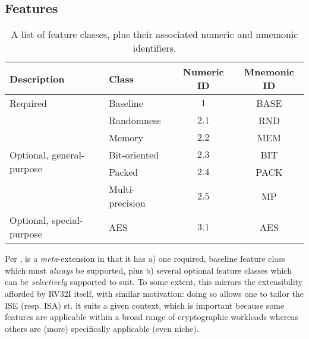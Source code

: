 
\subsection{Features}
\label{sec:bg:feature}

\begin{table}[t]
\begin{center}
\begin{tabular}{|l|l|cc|}
\hline
Description                                & Class           & Numeric ID & Mnemonic ID \\
\hline\hline
\multirow{1}{*}{Required                 } & Baseline        & $1$        & BASE        \\
\hline
\multirow{5}{*}{Optional, general-purpose} & Randomness      & $2.1$      & RND         \\
                                           & Memory          & $2.2$      & MEM         \\
                                           & Bit-oriented    & $2.3$      & BIT         \\
                                           & Packed          & $2.4$      & PACK        \\
                                           & Multi-precision & $2.5$      & MP          \\
\hline
\multirow{1}{*}{Optional, special-purpose} & AES             & $3.1$      & AES         \\
\hline
\end{tabular}
\end{center}
\caption{A list of feature classes, plus their associated numeric and mnemonic identifiers.}
\label{tab:feature}
\end{table}

Per , \XCID is a {\em meta}-extension in that it has 
a) one     required, baseline feature class
   which must {\em always} be supported,
   plus
b) several optional           feature classes
   which can be {\em selectively} supported to suit.
To some extent, this mirrors the extensibility afforded by RV32I itself, 
with similar motivation: doing so allows one to tailor the ISE (resp. ISA) 
st. it suits a given context, which is important because some features are 
applicable within a broad range of cryptographic workloads whereas others 
are (more) specifically applicable (even niche).

